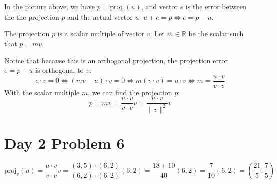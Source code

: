 \documentclass[preview, margin=0.6in]{standalone}
\begin{document}
In the picture above, we have $p=\mathrm{proj}_v(u)$, and vector $e$ is the error between the the projection $p$ and the actual vector $u$: $u+e=p\iff e=p-u$.

The projection $p$ is a scalar multiple of vector $v$. Let $m\in\mathbb R$ be the scalar such that $p=mv$.

Notice that because this is an orthogonal projection, the projection error $e=p-u$ is orthogonal to $v$:
\begin{equation*}
    e\cdot v=0
	\iff (mv-u)\cdot v=0
	\iff m(v\cdot v)=u\cdot v
	\iff m=\frac{u\cdot v}{v\cdot v}
\end{equation*}
With the scalar multiple $m$, we can find the projection $p$:
\begin{equation*}
    \boxed{p 
	=mv
	=\frac{u\cdot v}{v\cdot v}v
	=\frac{u\cdot v}{\lVert v \rVert^2}v}
\end{equation*}

\section*{Day 2 Problem 6}
\begin{equation*}
	\mathrm{proj}_v(u)
	=\frac{u\cdot v}{v\cdot v}v
	=\frac{(3,5)\cdot(6,2)}{(6,2)\cdot(6,2)}(6,2)
	=\frac{18+10}{40}(6,2)
	=\frac{7}{10}(6,2)
	=\boxed{\left( \frac{21}{5},\frac{7}{5} \right)}
\end{equation*}
\end{document}
